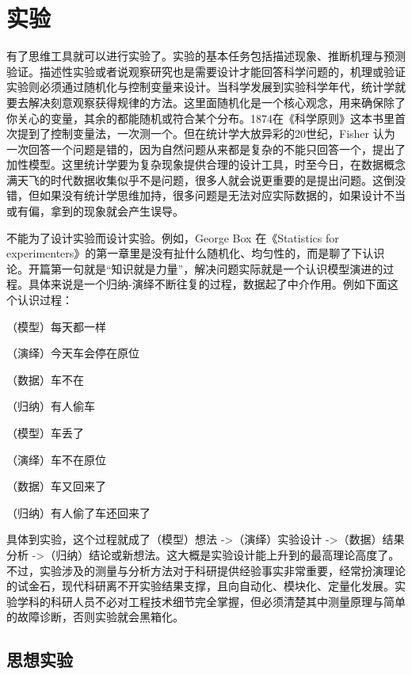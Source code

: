 \documentclass[]{tufte-book}
\begin{document}
\hypertarget{exp}{%
\chapter{实验}\label{exp}}

有了思维工具就可以进行实验了。实验的基本任务包括描述现象、推断机理与预测验证。描述性实验或者说观察研究也是需要设计才能回答科学问题的，机理或验证实验则必须通过随机化与控制变量来设计。当科学发展到实验科学年代，统计学就要去解决刻意观察获得规律的方法。这里面随机化是一个核心观念，用来确保除了你关心的变量，其余的都能随机或符合某个分布。1874在《科学原则》这本书里首次提到了控制变量法，一次测一个。但在统计学大放异彩的20世纪，Fisher 认为一次回答一个问题是错的，因为自然问题从来都是复杂的不能只回答一个，提出了加性模型。这里统计学要为复杂现象提供合理的设计工具，时至今日，在数据概念满天飞的时代数据收集似乎不是问题，很多人就会说更重要的是提出问题。这倒没错，但如果没有统计学思维加持，很多问题是无法对应实际数据的，如果设计不当或有偏，拿到的现象就会产生误导。

不能为了设计实验而设计实验。例如，George Box 在《Statistics for experimenters》的第一章里是没有扯什么随机化、均匀性的，而是聊了下认识论。开篇第一句就是``知识就是力量''，解决问题实际就是一个认识模型演进的过程。具体来说是一个归纳-演绎不断往复的过程，数据起了中介作用。例如下面这个认识过程：

（模型）每天都一样

（演绎）今天车会停在原位

（数据）车不在

（归纳）有人偷车

（模型）车丢了

（演绎）车不在原位

（数据）车又回来了

（归纳）有人偷了车还回来了

具体到实验，这个过程就成了（模型）想法 -\textgreater（演绎）实验设计 -\textgreater（数据）结果分析 -\textgreater（归纳）结论或新想法。这大概是实验设计能上升到的最高理论高度了。不过，实验涉及的测量与分析方法对于科研提供经验事实非常重要，经常扮演理论的试金石，现代科研离不开实验结果支撑，且向自动化、模块化、定量化发展。实验学科的科研人员不必对工程技术细节完全掌握，但必须清楚其中测量原理与简单的故障诊断，否则实验就会黑箱化。

\hypertarget{ux601dux60f3ux5b9eux9a8c}{%
\section{思想实验}\label{ux601dux60f3ux5b9eux9a8c}}
\end{document}
